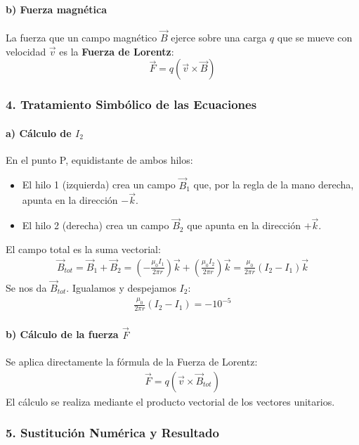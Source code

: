 \paragraph{b) Fuerza magnética}
La fuerza que un campo magnético $\vec{B}$ ejerce sobre una carga $q$ que se mueve con velocidad $\vec{v}$ es la \textbf{Fuerza de Lorentz}:
$$\vec{F} = q(\vec{v} \times \vec{B})$$

\subsubsection*{4. Tratamiento Simbólico de las Ecuaciones}
\paragraph{a) Cálculo de $I_2$}
En el punto P, equidistante de ambos hilos:
\begin{itemize}
    \item El hilo 1 (izquierda) crea un campo $\vec{B}_1$ que, por la regla de la mano derecha, apunta en la dirección $-\vec{k}$.
    \item El hilo 2 (derecha) crea un campo $\vec{B}_2$ que apunta en la dirección $+\vec{k}$.
\end{itemize}
El campo total es la suma vectorial:
\begin{gather}
    \vec{B}_{tot} = \vec{B}_1 + \vec{B}_2 = \left( -\frac{\mu_0 I_1}{2\pi r} \right)\vec{k} + \left( \frac{\mu_0 I_2}{2\pi r} \right)\vec{k} = \frac{\mu_0}{2\pi r}(I_2 - I_1)\vec{k}
\end{gather}
Se nos da $\vec{B}_{tot}$. Igualamos y despejamos $I_2$:
\begin{gather}
    \frac{\mu_0}{2\pi r}(I_2 - I_1) = -10^{-5}
\end{gather}
\paragraph{b) Cálculo de la fuerza $\vec{F}$}
Se aplica directamente la fórmula de la Fuerza de Lorentz:
\begin{gather}
    \vec{F} = q(\vec{v} \times \vec{B}_{tot})
\end{gather}
El cálculo se realiza mediante el producto vectorial de los vectores unitarios.

\subsubsection*{5. Sustitución Numérica y Resultado}
